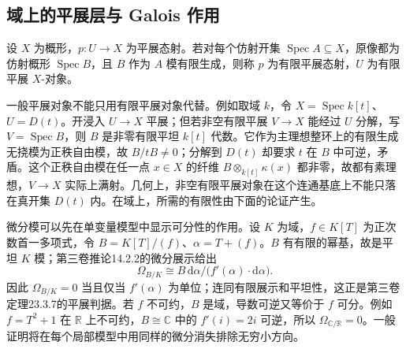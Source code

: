 \subsection{域上的平展层与 Galois 作用}
\label{b4:subsec:E04:02}

\begin{definition}\label{b4:def:finite-etale-object}
	设 \(X\) 为概形，\(p:U\rightarrow X\) 为平展态射。若对每个仿射开集 \(\operatorname{Spec}A\subseteq X\)，原像都为仿射概形 \(\operatorname{Spec}B\)，且 \(B\) 作为 \(A\) 模有限生成，则称 \(p\) 为有限平展态射，\(U\) 为有限平展 \(X\)-对象。
\end{definition}

一般平展对象不能只用有限平展对象代替。例如取域 \(k\)，令 \(X=\operatorname{Spec}k[t]\)、\(U=D(t)\)。开浸入 \(U\rightarrow X\) 平展；但若非空有限平展 \(V\rightarrow X\) 能经过 \(U\) 分解，写 \(V=\operatorname{Spec}B\)，则 \(B\) 是非零有限平坦 \(k[t]\) 代数。它作为主理想整环上的有限生成无挠模为正秩自由模，故 \(B/tB\ne0\)；分解到 \(D(t)\) 却要求 \(t\) 在 \(B\) 中可逆，矛盾。这个正秩自由模在任一点 \(x\in X\) 的纤维 \(B\otimes_{k[t]}\kappa(x)\) 都非零，故都有素理想，\(V\to X\) 实际上满射。几何上，非空有限平展对象在这个连通基底上不能只落在真开集 \(D(t)\) 内。在域上，所需的有限性由下面的论证产生。

\ProseParagraphBreak

微分模可以先在单变量模型中显示可分性的作用。设 \(K\) 为域，\(f\in K[T]\) 为正次数首一多项式，令 \(B=K[T]/(f)\)、\(\alpha=T+(f)\)。\(B\) 有有限的幂基，故是平坦 \(K\) 模；第三卷推论14.2.2的微分展示给出
\[
	\Omega_{B/K}\cong B\,\mathrm{d}\alpha/\bigl(f'(\alpha)\cdot\mathrm{d}\alpha\bigr).
\]
因此 \(\Omega_{B/K}=0\) 当且仅当 \(f'(\alpha)\) 为单位；连同有限展示和平坦性，这正是第三卷定理23.3.7的平展判据。若 \(f\) 不可约，\(B\) 是域，导数可逆又等价于 \(f\) 可分。例如 \(f=T^2+1\) 在 \(\mathbb R\) 上不可约，\(B\cong\mathbb C\) 中的 \(f'(i)=2i\) 可逆，所以 \(\Omega_{\mathbb C/\mathbb R}=0\)。一般证明将在每个局部模型中用同样的微分消失排除无穷小方向。

